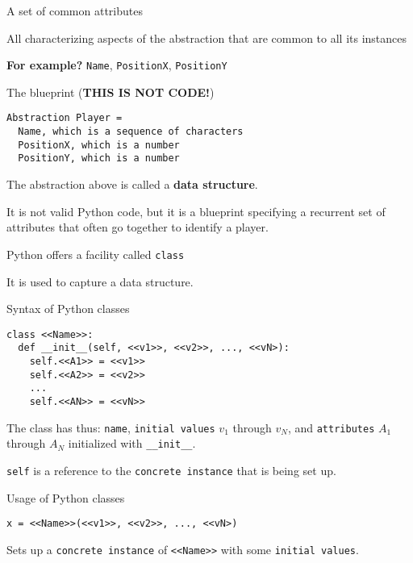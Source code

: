 \documentclass{beamer}
\begin{document}
\begin{slide}{
\item A set of common attributes
\item All characterizing aspects of the abstraction that are common to all its instances
\item \textbf{For example?} \pause \texttt{Name}, \texttt{PositionX}, \texttt{PositionY}
}\end{slide}

\begin{frame}[fragile]{The blueprint (\textbf{THIS IS NOT CODE!})}
\begin{lstlisting}
Abstraction Player =
  Name, which is a sequence of characters
  PositionX, which is a number
  PositionY, which is a number
\end{lstlisting}

The abstraction above is called a \textbf{data structure}.

It is not valid Python code, but it is a blueprint specifying a recurrent set of attributes that often go together to identify a player.

\end{frame}

\begin{slide}{
\item Python offers a facility called \texttt{class}
\item It is used to capture a data structure.
}\end{slide}

\begin{frame}[fragile]{Syntax of Python classes}
\begin{lstlisting}
class <<Name>>:
  def __init__(self, <<v1>>, <<v2>>, ..., <<vN>):
    self.<<A1>> = <<v1>>
    self.<<A2>> = <<v2>>
    ...
    self.<<AN>> = <<vN>>
\end{lstlisting}

The class has thus: \texttt{name}, \texttt{initial values} $v_1$ through $v_N$, and \texttt{attributes} $A_1$ through $A_N$ initialized with \texttt{\_\_init\_\_}.

\texttt{self} is a reference to the \texttt{concrete instance} that is being set up.
\end{frame}

\begin{frame}[fragile]{Usage of Python classes}
\begin{lstlisting}
x = <<Name>>(<<v1>>, <<v2>>, ..., <<vN>)
\end{lstlisting}

Sets up a \texttt{concrete instance} of \texttt{<<Name>>} with some \texttt{initial values}.
\end{frame}
\end{document}
